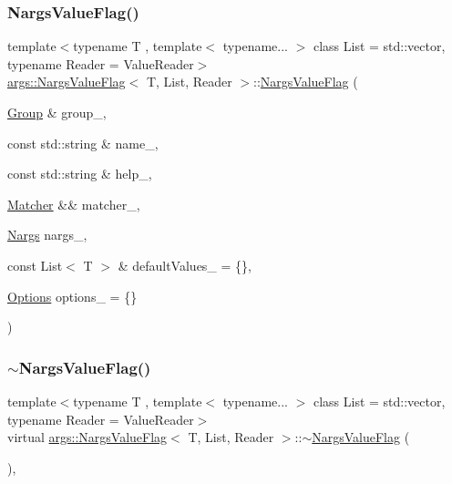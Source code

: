 \subsubsection{\texorpdfstring{Nargs\+Value\+Flag()}{NargsValueFlag()}}
{\footnotesize\ttfamily template$<$typename T , template$<$ typename... $>$ class List = std\+::vector, typename Reader  = Value\+Reader$>$ \\
\hyperlink{classargs_1_1_nargs_value_flag}{args\+::\+Nargs\+Value\+Flag}$<$ T, List, Reader $>$\+::\hyperlink{classargs_1_1_nargs_value_flag}{Nargs\+Value\+Flag} (\begin{DoxyParamCaption}\item[{\hyperlink{classargs_1_1_group}{Group} \&}]{group\+\_\+,  }\item[{const std\+::string \&}]{name\+\_\+,  }\item[{const std\+::string \&}]{help\+\_\+,  }\item[{\hyperlink{classargs_1_1_matcher}{Matcher} \&\&}]{matcher\+\_\+,  }\item[{\hyperlink{structargs_1_1_nargs}{Nargs}}]{nargs\+\_\+,  }\item[{const List$<$ T $>$ \&}]{default\+Values\+\_\+ = {\ttfamily \{\}},  }\item[{\hyperlink{namespaceargs_aa530c0f95194aa275f49a5f299ac9e77}{Options}}]{options\+\_\+ = {\ttfamily \{\}} }\end{DoxyParamCaption})\hspace{0.3cm}{\ttfamily [inline]}}

\mbox{\label{classargs_1_1_nargs_value_flag_af646d06281e7cb6d453cf36533639601}} 
\subsubsection{\texorpdfstring{$\sim$\+Nargs\+Value\+Flag()}{~NargsValueFlag()}}
{\footnotesize\ttfamily template$<$typename T , template$<$ typename... $>$ class List = std\+::vector, typename Reader  = Value\+Reader$>$ \\
virtual \hyperlink{classargs_1_1_nargs_value_flag}{args\+::\+Nargs\+Value\+Flag}$<$ T, List, Reader $>$\+::$\sim$\hyperlink{classargs_1_1_nargs_value_flag}{Nargs\+Value\+Flag} (\begin{DoxyParamCaption}{ }\end{DoxyParamCaption})\hspace{0.3cm}{\ttfamily [inline]}, {\ttfamily [virtual]}}



